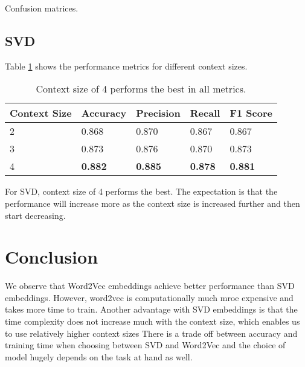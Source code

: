 \documentclass[a4paper,9pt]{report}
\begin{document}
Confusion matrices.
\subsection*{SVD}
Table \ref{tab:svd} shows the performance metrics for different context sizes. 
\begin{table}[H]
    \centering
    \begin{tabular}{|l|l|l|l|l|}
        \hline
        \textbf{Context Size} & \textbf{Accuracy} & \textbf{Precision} & \textbf{Recall} & \textbf{F1 Score} \\ \hline
        2 & 0.868 & 0.870 & 0.867 & 0.867 \\
        3 & 0.873 & 0.876 & 0.870 & 0.873 \\
        4 & \textbf{0.882} & \textbf{0.885} & \textbf{0.878} & \textbf{0.881} \\
        \hline
    \end{tabular}
    \caption{Context size of 4 performs the best in all metrics.}
    \label{tab:svd}
\end{table}
For SVD, context size of 4 performs the best. The expectation is that the performance will increase more as the context size is increased further and then start decreasing.

\section*{Conclusion}
We observe that Word2Vec embeddings achieve better performance than SVD embeddings. 
However, word2vec is computationally much mroe expensive and takes more time to train. 
Another advantage with SVD embeddings is that the time complexity does not increase much with the context size, which enables us to use relatively higher context sizes
There is a trade off between accuracy and training time when choosing between SVD and Word2Vec and the choice of model hugely depends on the task at hand as well.
\end{document}
